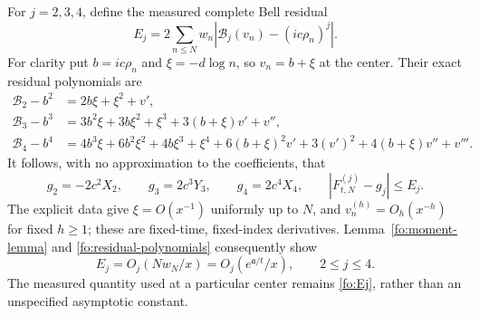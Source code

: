 \documentclass[11pt]{article}
\numberwithin{equation}{section}
\theoremstyle{definition}
\theoremstyle{remark}
\begin{document}
For $j=2,3,4$, define the measured complete Bell residual
\begin{equation}
E_j=2\sum_{n\le N}w_n
       |\mathcal B_j(v_n)-(ic\rho_n)^j|.
\label{fo:Ej}
\end{equation}
For clarity put $b=ic\rho_n$ and $\xi=-d\log n$, so $v_n=b+\xi$
at the center.  Their exact residual polynomials are
\begin{align}
\mathcal B_2-b^2&=2b\xi+\xi^2+v',\nonumber\\
\mathcal B_3-b^3&=3b^2\xi+3b\xi^2+\xi^3+3(b+\xi)v'+v'',
 \label{fo:residual-polynomials}\\
\mathcal B_4-b^4&=4b^3\xi+6b^2\xi^2+4b\xi^3+\xi^4
 +6(b+\xi)^2v'+3(v')^2+4(b+\xi)v''+v'''.\nonumber
\end{align}
It follows, with no approximation to the coefficients, that
\begin{equation}
g_2=-2c^2X_2,\qquad g_3=2c^3Y_3,\qquad g_4=2c^4X_4,
\qquad |F_{t,N}^{(j)}-g_j|\le E_j.
\label{fo:leading-jets}
\end{equation}
The explicit data give $\xi=O(x^{-1})$ uniformly up to $N$, and
$v_n^{(h)}=O_h(x^{-h})$ for fixed $h\ge1$; these are fixed-time,
fixed-index derivatives.  Lemma~\ref{fo:moment-lemma} and
\eqref{fo:residual-polynomials} consequently show
\begin{equation}
E_j=O_j(Nw_N/x)=O_j(e^{\mathfrak a/t}/x),\qquad 2\le j\le4.
\label{fo:Ej-scale}
\end{equation}
The measured quantity used at a particular center remains
\eqref{fo:Ej}, rather than an unspecified asymptotic constant.
\end{document}
